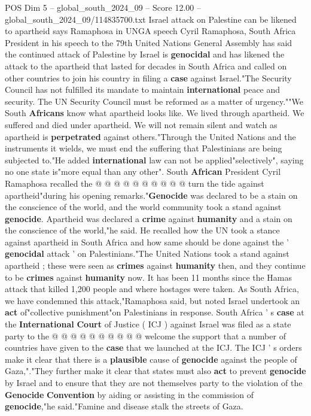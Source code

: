 \begin{textsample}{POS Dim 5 – global\_south\_2024\_09 – Score 12.00 – global\_south\_2024\_09/114835700.txt}  \label{ex:f5_pos_258}
Israel attack on Palestine can be likened to apartheid says Ramaphosa in UNGA speech Cyril Ramaphosa, South Africa President in his speech to the 79th United Nations General Assembly has said the continued attack of Palestine by Israel is \textbf{genocidal} and has likened the attack to the apartheid that lasted for decades in South Africa and called on other countries to join his country in filing a \textbf{case} against Israel."The Security Council has not fulfilled its mandate to maintain \textbf{international} peace and security.
The UN Security Council must be reformed as a matter of urgency.""We South \textbf{Africans} know what apartheid looks like.
We lived through apartheid.
We suffered and died under apartheid.
We will not remain silent and watch as apartheid is \textbf{perpetrated} against others."Through the United Nations and the instruments it wields, we must end the suffering that Palestinians are being subjected to."He added \textbf{international} law can not be applied"selectively", saying no one state is"more equal than any other".
South \textbf{African} President Cyril Ramaphosa recalled the @ @ @ @ @ @ @ @ @ @ turn the tide against apartheid"during his opening remarks."\textbf{Genocide} was declared to be a stain on the conscience of the world, and the world community took a stand against \textbf{genocide}.
Apartheid was declared a \textbf{crime} against \textbf{humanity} and a stain on the conscience of the world,"he said.
He recalled how the UN took a stance against apartheid in South Africa and how same should be done against the ' \textbf{genocidal} attack ' on Palestinians."The United Nations took a stand against apartheid ; these were seen as \textbf{crimes} against \textbf{humanity} then, and they continue to be \textbf{crimes} against \textbf{humanity} now.
It has been 11 months since the Hamas attack that killed 1,200 people and where hostages were taken.
As South Africa, we have condemned this attack,"Ramaphosa said, but noted Israel undertook an \textbf{act} of"collective punishment"on Palestinians in response.
South Africa ' s \textbf{case} at the \textbf{International} \textbf{Court} of Justice ( ICJ ) against Israel was filed as a state party to the @ @ @ @ @ @ @ @ @ @ welcome the support that a number of countries have given to the \textbf{case} that we launched at the ICJ.
The ICJ ' s orders make it clear that there is a \textbf{plausible} cause of \textbf{genocide} against the people of Gaza,"."They further make it clear that states must also \textbf{act} to prevent \textbf{genocide} by Israel and to ensure that they are not themselves party to the violation of the \textbf{Genocide} \textbf{Convention} by aiding or assisting in the commission of \textbf{genocide},"he said."Famine and disease stalk the streets of Gaza.

\end{textsample}
